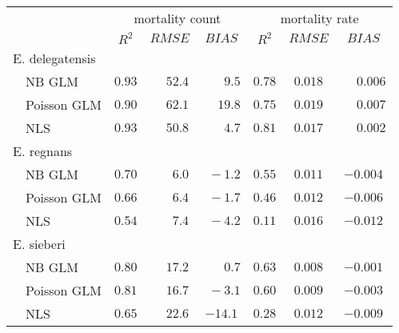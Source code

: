 \begin{tabular}{llcccccc}
\toprule
& & \multicolumn{3}{c}{mortality count} & \multicolumn{3}{c}{mortality rate} \\ \cmidrule(lr){3-5}\cmidrule(lr){6-8}
 &  & $R^2$ & $RMSE$ & $BIAS$ & $R^2$ & $RMSE$ & \multicolumn{1}{c}{$BIAS$} \\ 
\midrule
\multicolumn{2}{l}{E. delegatensis} \\  & NB GLM  & $0.93$ & $\phantom{-}52.4$ & $\phantom{0}\phantom{-}9.5$ & $0.78$ & $0.018$ & $\phantom{-}0.006$ \\
 & Poisson GLM  & $0.90$ & $\phantom{-}62.1$ & $\phantom{-}19.8$ & $0.75$ & $0.019$ & $\phantom{-}0.007$ \\
 & NLS  & $0.93$ & $\phantom{-}50.8$ & $\phantom{0}\phantom{-}4.7$ & $0.81$ & $0.017$ & $\phantom{-}0.002$ \\
\multicolumn{2}{l}{E. regnans} \\  & NB GLM  & $0.70$ & $\phantom{0}\phantom{-}6.0$ & $\phantom{0}-1.2$ & $0.55$ & $0.011$ & $-0.004$ \\
 & Poisson GLM  & $0.66$ & $\phantom{0}\phantom{-}6.4$ & $\phantom{0}-1.7$ & $0.46$ & $0.012$ & $-0.006$ \\
 & NLS  & $0.54$ & $\phantom{0}\phantom{-}7.4$ & $\phantom{0}-4.2$ & $0.11$ & $0.016$ & $-0.012$ \\
\multicolumn{2}{l}{E. sieberi} \\  & NB GLM  & $0.80$ & $\phantom{-}17.2$ & $\phantom{0}\phantom{-}0.7$ & $0.63$ & $0.008$ & $-0.001$ \\
 & Poisson GLM  & $0.81$ & $\phantom{-}16.7$ & $\phantom{0}-3.1$ & $0.60$ & $0.009$ & $-0.003$ \\
 & NLS  & $0.65$ & $\phantom{-}22.6$ & $-14.1$ & $0.28$ & $0.012$ & $-0.009$ \\
\bottomrule 
\end{tabular}
